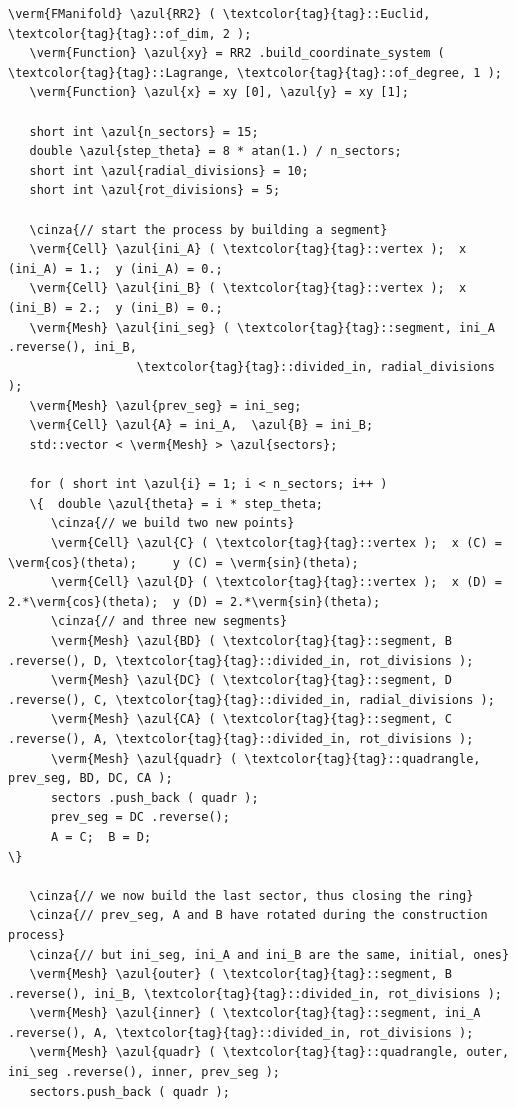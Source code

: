 \begin{Verbatim}[commandchars=\\\{\},formatcom=\small\tt,frame=single,
   label=parag-\ref{\numb section 9.\numb parag 2}.cpp,rulecolor=\color{coment},
   baselinestretch=0.94,framesep=2mm                                            ]
   \verm{FManifold} \azul{RR2} ( \textcolor{tag}{tag}::Euclid, \textcolor{tag}{tag}::of_dim, 2 );
   \verm{Function} \azul{xy} = RR2 .build_coordinate_system ( \textcolor{tag}{tag}::Lagrange, \textcolor{tag}{tag}::of_degree, 1 );
   \verm{Function} \azul{x} = xy [0], \azul{y} = xy [1];

   short int \azul{n_sectors} = 15;
   double \azul{step_theta} = 8 * atan(1.) / n_sectors;
   short int \azul{radial_divisions} = 10;
   short int \azul{rot_divisions} = 5;

   \cinza{// start the process by building a segment}
   \verm{Cell} \azul{ini_A} ( \textcolor{tag}{tag}::vertex );  x (ini_A) = 1.;  y (ini_A) = 0.;
   \verm{Cell} \azul{ini_B} ( \textcolor{tag}{tag}::vertex );  x (ini_B) = 2.;  y (ini_B) = 0.;
   \verm{Mesh} \azul{ini_seg} ( \textcolor{tag}{tag}::segment, ini_A .reverse(), ini_B,
                  \textcolor{tag}{tag}::divided_in, radial_divisions     );
   \verm{Mesh} \azul{prev_seg} = ini_seg;
   \verm{Cell} \azul{A} = ini_A,  \azul{B} = ini_B;
   std::vector < \verm{Mesh} > \azul{sectors};

   for ( short int \azul{i} = 1; i < n_sectors; i++ )
   \{  double \azul{theta} = i * step_theta;
      \cinza{// we build two new points}
      \verm{Cell} \azul{C} ( \textcolor{tag}{tag}::vertex );  x (C) = \verm{cos}(theta);     y (C) = \verm{sin}(theta);
      \verm{Cell} \azul{D} ( \textcolor{tag}{tag}::vertex );  x (D) = 2.*\verm{cos}(theta);  y (D) = 2.*\verm{sin}(theta);
      \cinza{// and three new segments}
      \verm{Mesh} \azul{BD} ( \textcolor{tag}{tag}::segment, B .reverse(), D, \textcolor{tag}{tag}::divided_in, rot_divisions );
      \verm{Mesh} \azul{DC} ( \textcolor{tag}{tag}::segment, D .reverse(), C, \textcolor{tag}{tag}::divided_in, radial_divisions );
      \verm{Mesh} \azul{CA} ( \textcolor{tag}{tag}::segment, C .reverse(), A, \textcolor{tag}{tag}::divided_in, rot_divisions );
      \verm{Mesh} \azul{quadr} ( \textcolor{tag}{tag}::quadrangle, prev_seg, BD, DC, CA );
      sectors .push_back ( quadr );
      prev_seg = DC .reverse();
      A = C;  B = D;                                                             \}

   \cinza{// we now build the last sector, thus closing the ring}
   \cinza{// prev_seg, A and B have rotated during the construction process}
   \cinza{// but ini_seg, ini_A and ini_B are the same, initial, ones}
   \verm{Mesh} \azul{outer} ( \textcolor{tag}{tag}::segment, B .reverse(), ini_B, \textcolor{tag}{tag}::divided_in, rot_divisions );
   \verm{Mesh} \azul{inner} ( \textcolor{tag}{tag}::segment, ini_A .reverse(), A, \textcolor{tag}{tag}::divided_in, rot_divisions );
   \verm{Mesh} \azul{quadr} ( \textcolor{tag}{tag}::quadrangle, outer, ini_seg .reverse(), inner, prev_seg );
   sectors.push_back ( quadr );
   

\end{Verbatim}
